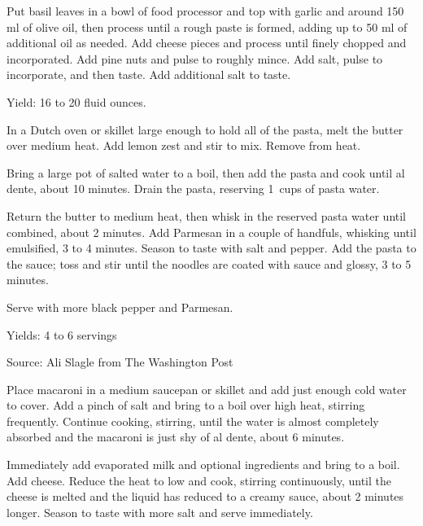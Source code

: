 \documentclass[letterpaper]{recipePMG}
\newcommand{\half}{\nicefrac{1}{2} \,}
\begin{document}
Put basil leaves in a bowl of food processor and top with garlic and around 150 ml of olive oil, then process until a rough paste is formed, adding up to 50 ml of additional oil as needed. Add cheese pieces and process until finely chopped and incorporated. Add pine nuts and pulse to roughly mince. Add salt, pulse to incorporate, and then taste. Add additional salt to taste. 

Yield: 16 to 20 fluid ounces.


\newpage
{}


In a Dutch oven or skillet large enough to hold all of the pasta, melt the butter over medium heat. Add lemon zest and stir to mix. Remove from heat.

Bring a large pot of salted water to a boil, then add the pasta and cook until al dente, about 10 minutes. Drain the pasta, reserving 1\half cups of pasta water.

Return the butter to medium heat, then whisk in the reserved pasta water until combined, about 2 minutes. Add Parmesan in a couple of handfuls, whisking until emulsified, 3 to 4 minutes. Season to taste with salt and pepper. Add the pasta to the sauce; toss and stir until the noodles are coated with sauce and glossy, 3 to 5 minutes.

Serve with more black pepper and Parmesan.

Yields: 4 to 6 servings

Source: Ali Slagle from The Washington Post


Place macaroni in a medium saucepan or skillet and add just enough cold water to cover. Add a pinch of salt and bring to a boil over high heat, stirring frequently. Continue cooking, stirring, until the water is almost completely absorbed and the macaroni is just shy of al dente, about 6 minutes.

Immediately add evaporated milk and optional ingredients and bring to a boil. Add cheese. Reduce the heat to low and cook, stirring continuously, until the cheese is melted and the liquid has reduced to a creamy sauce, about 2 minutes longer. Season to taste with more salt and serve immediately. 
\end{document}
